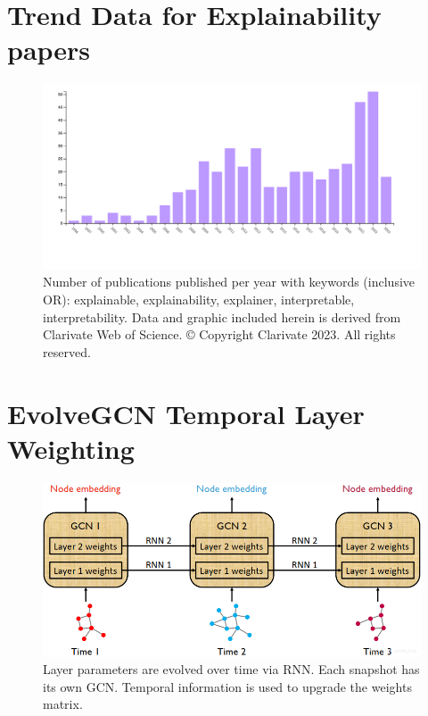 \section{Trend Data for Explainability papers}
\begin{figure}[h]
    \centering
    \includegraphics[width=.75\textwidth]{images/publications-keywords.jpg}
    \caption{
    Number of publications published per year with keywords (inclusive OR): explainable, explainability, explainer, interpretable, interpretability. Data and graphic included herein is derived from Clarivate Web of Science. © Copyright Clarivate 2023. All rights reserved.}
    \label{fig:publications-keywords}
\end{figure}

\section{EvolveGCN Temporal Layer Weighting}
\begin{figure}[h]
    \centering
    \includegraphics[width=.75\textwidth]{images/evolve-gcn.png}
    \caption{Layer parameters are evolved over time via RNN\cite{pareja_evolvegcn_2019}. Each snapshot has its own GCN. Temporal information is used to upgrade the weights matrix.}
    \label{fig:EvolveGCN}
\end{figure}

